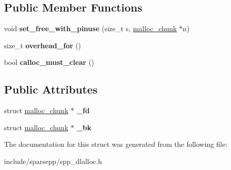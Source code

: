\subsection*{Public Member Functions}
\begin{DoxyCompactItemize}
\item 
void {\bfseries set\+\_\+free\+\_\+with\+\_\+pinuse} (size\+\_\+t s, \hyperlink{structspp_1_1malloc__chunk}{malloc\+\_\+chunk} $\ast$n)\hypertarget{structspp_1_1malloc__chunk_af9d016122193822dc4ce3126ab118c4b}{}\label{structspp_1_1malloc__chunk_af9d016122193822dc4ce3126ab118c4b}

\item 
size\+\_\+t {\bfseries overhead\+\_\+for} ()\hypertarget{structspp_1_1malloc__chunk_ac2402d2b3ed21c2aae94979b5544edeb}{}\label{structspp_1_1malloc__chunk_ac2402d2b3ed21c2aae94979b5544edeb}

\item 
bool {\bfseries calloc\+\_\+must\+\_\+clear} ()\hypertarget{structspp_1_1malloc__chunk_acdd6b29fb12ae982edc1e86319a07b02}{}\label{structspp_1_1malloc__chunk_acdd6b29fb12ae982edc1e86319a07b02}

\end{DoxyCompactItemize}
\subsection*{Public Attributes}
\begin{DoxyCompactItemize}
\item 
struct \hyperlink{structspp_1_1malloc__chunk}{malloc\+\_\+chunk} $\ast$ {\bfseries \+\_\+fd}\hypertarget{structspp_1_1malloc__chunk_a89fd4549101be4cbbfd1e44be4fcef42}{}\label{structspp_1_1malloc__chunk_a89fd4549101be4cbbfd1e44be4fcef42}

\item 
struct \hyperlink{structspp_1_1malloc__chunk}{malloc\+\_\+chunk} $\ast$ {\bfseries \+\_\+bk}\hypertarget{structspp_1_1malloc__chunk_a8b42a2925609cb1aa3e6f7d3586a85b2}{}\label{structspp_1_1malloc__chunk_a8b42a2925609cb1aa3e6f7d3586a85b2}

\end{DoxyCompactItemize}


The documentation for this struct was generated from the following file\+:\begin{DoxyCompactItemize}
\item 
include/sparsepp/spp\+\_\+dlalloc.\+h\end{DoxyCompactItemize}
